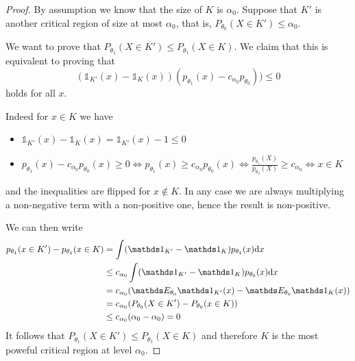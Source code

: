 \documentclass[12pt]{extarticle}
\begin{document}
\begin{proof}
	By assumption we know that the size of $K$ is $\alpha_0$.
	Suppose that $K'$ is another critical region of size at most $\alpha_0$,
	that is, $P_{\theta_0}(X \in K') \leq \alpha_0$.

	We want to prove that
	$P_{\theta_1}(X \in K') \leq P_{\theta_1}(X \in K)$.
	We claim that this is equivalent to proving that
	\begin{equation}
		(\mathds{1}_{K'}(x) - \mathds{1}_{K}(x))(p_{\theta_1}(x) - c_{\alpha_0}p_{\theta_0})) \leq 0
	\end{equation}
	holds for all $x$.

	Indeed for $x \in K$ we have
	\begin{itemize}
		\item $\mathds 1_{K'}(x) - \mathds 1_{K}(x) = \mathds 1_{K'}(x) -1 \leq 0$
		\item $p_{\theta_1}(x) - c_{\alpha_0}p_{\theta_0}(x) \geq 0 \iff p_{\theta_1}(x) \geq c_{\alpha_0}p_{\theta_0}(x) \iff \frac{p_{\theta_1}(X)}{p_{\theta_0}(X)} \geq c_{\alpha_0} \iff x \in K$
	\end{itemize}
	and the inequalities are flipped for $x \notin K$.
	In any case we are always multiplying a non-negative term with a non-positive one,
	hence the result is non-positive.

	We can then write
	\begin{align}
		p_{\theta_1}(x \in K') - p_{\theta_1}(x \in K) & = \int (\mathds 1_{K'} - \mathds 1_{K}) p_{\theta_1}(x) \dd x                   \\
		                                               & \leq c_{\alpha_0} \int (\mathds 1_{K'} - \mathds 1_{K}) p_{\theta_0}(x) \dd x   \\
		                                               & = c_{\alpha_0} (\E_{\theta_0} \mathds 1_{K'}(x) - \E_{\theta_0} \mathds 1_K(x)) \\
		                                               & = c_{\alpha_0} (P_{\theta_0}(X \in K') - P_{\theta_0}(x \in K))                 \\
		                                               & \leq c_{\alpha_0} (\alpha_0 - \alpha_0) = 0
	\end{align}
	It follows that $P_{\theta_1}(X \in K') \leq P_{\theta_1}(X \in K)$
	and therefore $K$ is the most poweful critical region at level $\alpha_0$.
\end{proof}
\end{document}
